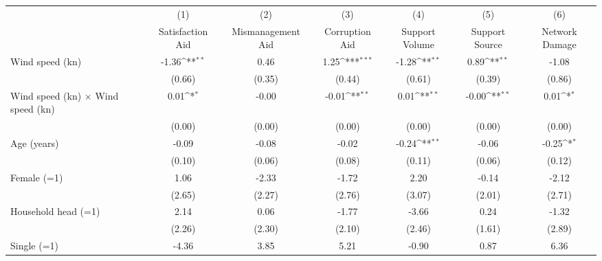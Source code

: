 {
\def\sym#1{\ifmmode^{#1}\else\(^{#1}\)\fi}
\begin{tabular}{l*{6}{c}}
\toprule
                    &\multicolumn{1}{c}{(1)}&\multicolumn{1}{c}{(2)}&\multicolumn{1}{c}{(3)}&\multicolumn{1}{c}{(4)}&\multicolumn{1}{c}{(5)}&\multicolumn{1}{c}{(6)}\\
                    &\multicolumn{1}{c}{Satisfaction Aid}&\multicolumn{1}{c}{Mismanagement Aid}&\multicolumn{1}{c}{Corruption Aid}&\multicolumn{1}{c}{Support Volume}&\multicolumn{1}{c}{Support Source}&\multicolumn{1}{c}{Network Damage}\\
\midrule
Wind speed (kn)     &       -1.36\sym{**} &        0.46         &        1.25\sym{***}&       -1.28\sym{**} &        0.89\sym{**} &       -1.08         \\
                    &      (0.66)         &      (0.35)         &      (0.44)         &      (0.61)         &      (0.39)         &      (0.86)         \\
Wind speed (kn) $\times$ Wind speed (kn)&        0.01\sym{*}  &       -0.00         &       -0.01\sym{**} &        0.01\sym{**} &       -0.00\sym{**} &        0.01\sym{*}  \\
                    &      (0.00)         &      (0.00)         &      (0.00)         &      (0.00)         &      (0.00)         &      (0.00)         \\
Age (years)         &       -0.09         &       -0.08         &       -0.02         &       -0.24\sym{**} &       -0.06         &       -0.25\sym{*}  \\
                    &      (0.10)         &      (0.06)         &      (0.08)         &      (0.11)         &      (0.06)         &      (0.12)         \\
Female (=1)         &        1.06         &       -2.33         &       -1.72         &        2.20         &       -0.14         &       -2.12         \\
                    &      (2.65)         &      (2.27)         &      (2.76)         &      (3.07)         &      (2.01)         &      (2.71)         \\
Household head (=1) &        2.14         &        0.06         &       -1.77         &       -3.66         &        0.24         &       -1.32         \\
                    &      (2.26)         &      (2.30)         &      (2.10)         &      (2.46)         &      (1.61)         &      (2.89)         \\
Single (=1)         &       -4.36         &        3.85         &        5.21         &       -0.90         &        0.87         &        6.36         \\

\end{tabular}}
